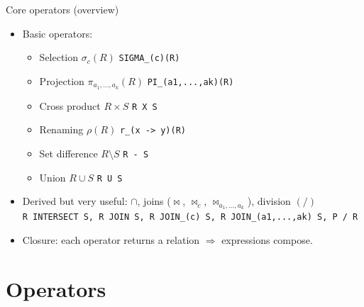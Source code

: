 \documentclass[10pt,aspectratio=169]{beamer}
\newcommand{\select}{\sigma}
\newcommand{\proj}{\pi}
\newcommand{\rename}{\rho}
\begin{document}
\begin{frame}{Core operators (overview)}
\begin{itemize}
  \item Basic operators:
  \begin{itemize}
    \item Selection \(\select_c(R)\) \hfill \texttt{SIGMA\_(c)(R)}
    \item Projection \(\proj_{a_1,\dots,a_k}(R)\) \hfill \texttt{PI\_(a1,...,ak)(R)}
    \item Cross product \(R \times S\) \hfill \texttt{R X S}
    \item Renaming \(\rename(R)\) \hfill \texttt{r\_(x -> y)(R)}
    \item Set difference \(R \setminus S\) \hfill \texttt{R - S}
    \item Union \(R \cup S\) \hfill \texttt{R U S}
  \end{itemize}
  \item Derived but very useful:
  \(\cap\), joins (\(\Join\), \(\Join_c\), \(\Join_{a_1,\dots,a_k}\)), division \((/)\)\\
  \hspace*{1.2em}\texttt{R INTERSECT S, R JOIN S, R JOIN\_(c) S, R JOIN\_(a1,...,ak) S, P / R}
  \item Closure: each operator returns a relation \(\Rightarrow\) expressions compose.
\end{itemize}
\end{frame}

\section{Operators}
\end{document}
